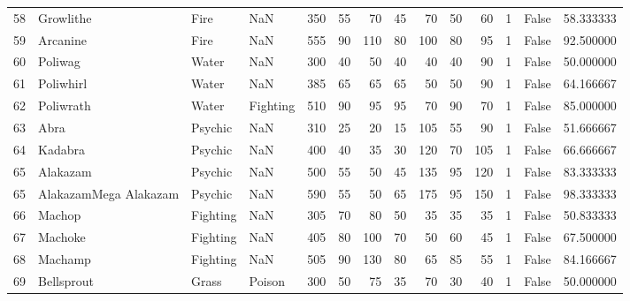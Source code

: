 \begin{tabular}{rlllrrrrrrrrlr}
  58 &                  Growlithe &      Fire &       NaN &    350 &   55 &      70 &       45 &       70 &       50 &     60 &           1 &      False &   58.333333 \\
  59 &                   Arcanine &      Fire &       NaN &    555 &   90 &     110 &       80 &      100 &       80 &     95 &           1 &      False &   92.500000 \\
  60 &                    Poliwag &     Water &       NaN &    300 &   40 &      50 &       40 &       40 &       40 &     90 &           1 &      False &   50.000000 \\
  61 &                  Poliwhirl &     Water &       NaN &    385 &   65 &      65 &       65 &       50 &       50 &     90 &           1 &      False &   64.166667 \\
  62 &                  Poliwrath &     Water &  Fighting &    510 &   90 &      95 &       95 &       70 &       90 &     70 &           1 &      False &   85.000000 \\
  63 &                       Abra &   Psychic &       NaN &    310 &   25 &      20 &       15 &      105 &       55 &     90 &           1 &      False &   51.666667 \\
  64 &                    Kadabra &   Psychic &       NaN &    400 &   40 &      35 &       30 &      120 &       70 &    105 &           1 &      False &   66.666667 \\
  65 &                   Alakazam &   Psychic &       NaN &    500 &   55 &      50 &       45 &      135 &       95 &    120 &           1 &      False &   83.333333 \\
  65 &      AlakazamMega Alakazam &   Psychic &       NaN &    590 &   55 &      50 &       65 &      175 &       95 &    150 &           1 &      False &   98.333333 \\
  66 &                     Machop &  Fighting &       NaN &    305 &   70 &      80 &       50 &       35 &       35 &     35 &           1 &      False &   50.833333 \\
  67 &                    Machoke &  Fighting &       NaN &    405 &   80 &     100 &       70 &       50 &       60 &     45 &           1 &      False &   67.500000 \\
  68 &                    Machamp &  Fighting &       NaN &    505 &   90 &     130 &       80 &       65 &       85 &     55 &           1 &      False &   84.166667 \\
  69 &                 Bellsprout &     Grass &    Poison &    300 &   50 &      75 &       35 &       70 &       30 &     40 &           1 &      False &   50.000000 \\

\end{tabular}
